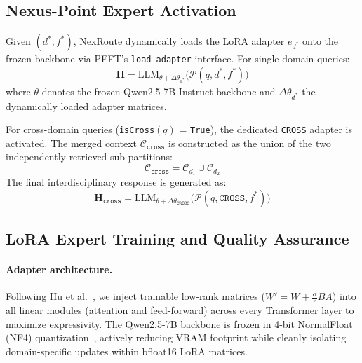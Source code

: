 \documentclass[a4paper,fleql,doubleblind]{cas-sc}
\begin{document}
\subsection{Nexus-Point Expert Activation}
\label{ssec:nexus}
Given $(d^*, f^*)$, NexRoute dynamically loads the LoRA adapter $e_{d^*}$
onto the frozen backbone via PEFT's \texttt{load\_adapter} interface.
For single-domain queries:
\begin{equation}
    \mathbf{H} = \text{LLM}_{\theta + \Delta\theta_{d^*}} \big(
    \mathcal{P}(q, d^*, f^*) \big)
    \label{eq:single}
\end{equation}
where $\theta$ denotes the frozen Qwen2.5-7B-Instruct backbone and
$\Delta\theta_{d^*}$ the dynamically loaded adapter matrices.

For cross-domain queries (\texttt{isCross}$(q)$ = \texttt{True}), the
dedicated \texttt{CROSS} adapter is activated. The merged context
$\mathcal{C}_{\texttt{cross}}$ is constructed as the union of the two
independently retrieved sub-partitions:
\begin{equation}
    \mathcal{C}_{\texttt{cross}} = \mathcal{C}_{d_1} \cup \mathcal{C}_{d_2}
    \label{eq:cross_ctx}
\end{equation}
The final interdisciplinary response is generated as:
\begin{equation}
    \mathbf{H}_{\texttt{cross}} = \text{LLM}_{\theta +
    \Delta\theta_{\texttt{CROSS}}}
    \big( \mathcal{P}(q, \texttt{CROSS}, f^*) \big)
    \label{eq:cross_gen}
\end{equation}

\subsection{LoRA Expert Training and Quality Assurance}
\label{ssec:loratrain}
\paragraph{Adapter architecture.}
Following Hu et al.~\citep{hu2022lora}, we inject trainable low-rank matrices ($W' = W + \frac{\alpha}{r} BA$) into all linear modules (attention and feed-forward) across every Transformer layer to maximize expressivity. The Qwen2.5-7B backbone is frozen in 4-bit NormalFloat (NF4) quantization~\citep{dettmers2023qlora}, actively reducing VRAM footprint while cleanly isolating domain-specific updates within bfloat16 LoRA matrices.
\end{document}
